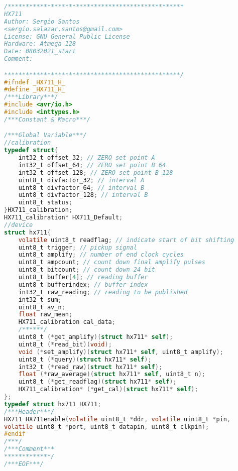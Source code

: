 \begin{lstlisting}[language=C, caption={hx711.h}, label=hx711-h, captionpos=b]
/*************************************************
HX711
Author: Sergio Santos
<sergio.salazar.santos@gmail.com>
License: GNU General Public License
Hardware: Atmega 128
Date: 08032021_start
Comment:

*************************************************/
#ifndef _HX711_H_
#define _HX711_H_
/***Library***/
#include <avr/io.h>
#include <inttypes.h>
/***Constant & Macro***/

/***Global Variable***/
//calibration
typedef struct{
	int32_t offset_32; // ZERO set point A
	int32_t offset_64; // ZERO set point B 64
	int32_t offset_128; // ZERO set point B 128
	uint8_t divfactor_32; // interval A
	uint8_t divfactor_64; // interval B
	uint8_t divfactor_128; // interval B
	uint8_t status;
}HX711_calibration;
HX711_calibration* HX711_Default;
//device
struct hx711{
	volatile uint8_t readflag; // indicate start of bit shifting
	uint8_t trigger; // pickup signal
	uint8_t amplify; // number of end clock cycles
	uint8_t ampcount; // count down final amplify pulses
	uint8_t bitcount; // count down 24 bit
	uint8_t buffer[4]; // reading buffer
	uint8_t bufferindex; // buffer index
	int32_t raw_reading; // reading to be published
	int32_t sum;
	uint8_t av_n;
	float raw_mean;
	HX711_calibration cal_data;
	/******/
	uint8_t (*get_amplify)(struct hx711* self);
	uint8_t (*read_bit)(void);
	void (*set_amplify)(struct hx711* self, uint8_t amplify);
	uint8_t (*query)(struct hx711* self);
	int32_t (*read_raw)(struct hx711* self);
	float (*raw_average)(struct hx711* self, uint8_t n);
	uint8_t (*get_readflag)(struct hx711* self);
	HX711_calibration* (*get_cal)(struct hx711* self);
};
typedef struct hx711 HX711;
/***Header***/
HX711 HX711enable(volatile uint8_t *ddr, volatile uint8_t *pin,
volatile uint8_t *port, uint8_t datapin, uint8_t clkpin);
#endif
/***/
/***Comment***
*************/
/***EOF***/
\end{lstlisting}
